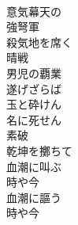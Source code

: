 \documentclass[10pt,b5j]{tarticle} %
\begin{document}
\begin{enumerate}
\begin{minipage}[c]{\blocksize}
        \vspace{\linespace}
        \item~\\
        意気幕天の\\
        強弩軍\\
        殺気地を席く\\
        晴戦\\
        男児の覇業\\
        遂げざらば\\
        玉と砕けん\\
        名に死せん\\
        素破\\
        乾坤を擲ちて\\
        血潮に叫ぶ\\
        時や今\\
        血潮に謳う\\
        時や今
    
    \end{minipage}
\end{enumerate} %
\end{document}
